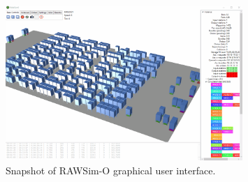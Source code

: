 \documentclass[../../Thesis.tex]{subfiles}
\begin{document}
			\begin{figure}
			    \centering
			    \includegraphics[width=0.8\textwidth]{../../Images/Data_collection/rawsim-o-3d.png}
			    \caption{Snapshot of RAWSim-O graphical user interface.}
			    \label{fig:RAWSim-O_gui_snapshot}
			\end{figure}
\end{document}

